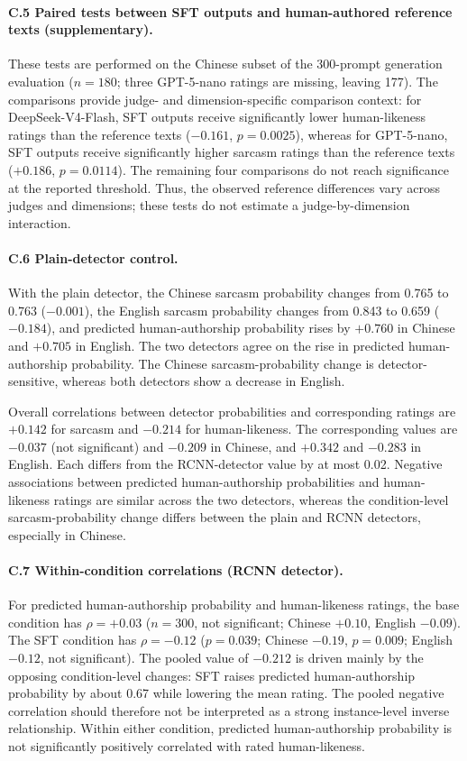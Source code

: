 \paragraph{C.5 Paired tests between SFT outputs and human-authored reference texts (supplementary).} These tests are performed on the Chinese subset of the 300-prompt generation evaluation ($n = 180$; three GPT-5-nano ratings are missing, leaving 177). The comparisons provide judge- and dimension-specific comparison context: for DeepSeek-V4-Flash, SFT outputs receive significantly lower human-likeness ratings than the reference texts ($-0.161$, $p = 0.0025$), whereas for GPT-5-nano, SFT outputs receive significantly higher sarcasm ratings than the reference texts ($+0.186$, $p = 0.0114$). The remaining four comparisons do not reach significance at the reported threshold. Thus, the observed reference differences vary across judges and dimensions; these tests do not estimate a judge-by-dimension interaction.

\paragraph{C.6 Plain-detector control.} With the plain detector, the Chinese sarcasm probability changes from 0.765 to 0.763 ($-0.001$), the English sarcasm probability changes from 0.843 to 0.659 ($-0.184$), and predicted human-authorship probability rises by $+0.760$ in Chinese and $+0.705$ in English. The two detectors agree on the rise in predicted human-authorship probability. The Chinese sarcasm-probability change is detector-sensitive, whereas both detectors show a decrease in English.

Overall correlations between detector probabilities and corresponding ratings are $+0.142$ for sarcasm and $-0.214$ for human-likeness. The corresponding values are $-0.037$ (not significant) and $-0.209$ in Chinese, and $+0.342$ and $-0.283$ in English. Each differs from the RCNN-detector value by at most 0.02. Negative associations between predicted human-authorship probabilities and human-likeness ratings are similar across the two detectors, whereas the condition-level sarcasm-probability change differs between the plain and RCNN detectors, especially in Chinese.

\label{app:c7}\paragraph{C.7 Within-condition correlations (RCNN detector).} For predicted human-authorship probability and human-likeness ratings, the base condition has $\rho = +0.03$ ($n = 300$, not significant; Chinese $+0.10$, English $-0.09$). The SFT condition has $\rho = -0.12$ ($p = 0.039$; Chinese $-0.19$, $p = 0.009$; English $-0.12$, not significant). The pooled value of $-0.212$ is driven mainly by the opposing condition-level changes: SFT raises predicted human-authorship probability by about 0.67 while lowering the mean rating. The pooled negative correlation should therefore not be interpreted as a strong instance-level inverse relationship. Within either condition, predicted human-authorship probability is not significantly positively correlated with rated human-likeness.

